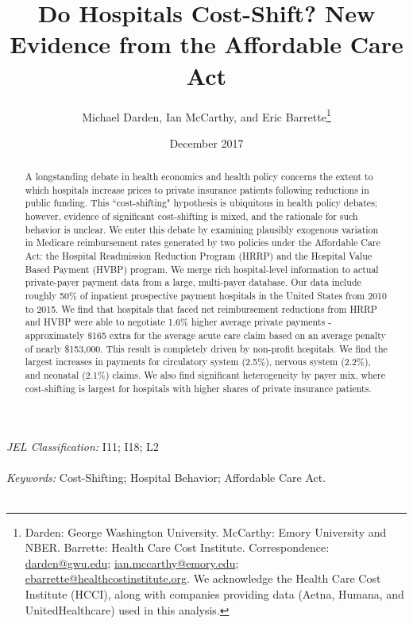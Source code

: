 \documentclass[12pt]{article}
\begin{document}
\title{Do Hospitals Cost-Shift? New Evidence from the Affordable Care Act}
\author{%
  Michael Darden, Ian McCarthy, and Eric Barrette\thanks{Darden: George Washington University. McCarthy: Emory University and NBER. Barrette: Health Care Cost Institute.  Correspondence: \href{mailto:darden@gwu.edu}{darden@gwu.edu}; \href{mailto:ian.mccarthy@emory.edu}{ian.mccarthy@emory.edu}; \href{mailto:ebarrette@healthcostinstitute.org}{ebarrette@healthcostinstitute.org}. We acknowledge the Health Care Cost Institute (HCCI), along with companies providing data (Aetna, Humana, and UnitedHealthcare) used in this analysis.}
}
\date{December 2017}

\maketitle

\begin{abstract}
A longstanding debate in health economics and health policy concerns the extent to which hospitals increase prices to private insurance patients following reductions in public funding.  This ``cost-shifting" hypothesis is ubiquitous in health policy debates; however, evidence of significant cost-shifting is mixed, and the rationale for such behavior is unclear.  We enter this debate by examining plausibly exogenous variation in Medicare reimbursement rates generated by two policies under the Affordable Care Act: the Hospital Readmission Reduction Program (HRRP) and the Hospital Value Based Payment (HVBP) program.  We merge rich hospital-level information to actual private-payer payment data from a large, multi-payer database. Our data include roughly 50$\%$ of inpatient prospective payment hospitals in the United States from 2010 to 2015. We find that hospitals that faced net reimbursement reductions from HRRP and HVBP were able to negotiate 1.6$\%$ higher average private payments - approximately $\$$165 extra for the average acute care claim based on an average penalty of nearly \$153,000.  This result is completely driven by non-profit hospitals.  We find the largest increases in payments for circulatory system (2.5$\%$), nervous system (2.2$\%$), and neonatal (2.1$\%$) claims.  We also find significant heterogeneity by payer mix, where cost-shifting is largest for hospitals with higher shares of private insurance patients.
\end{abstract}
\noindent \textit{JEL Classification:} I11; I18; L2 \\\\
\noindent \textit{Keywords:} Cost-Shifting; Hospital Behavior; Affordable Care Act.\\\\
\end{document}
